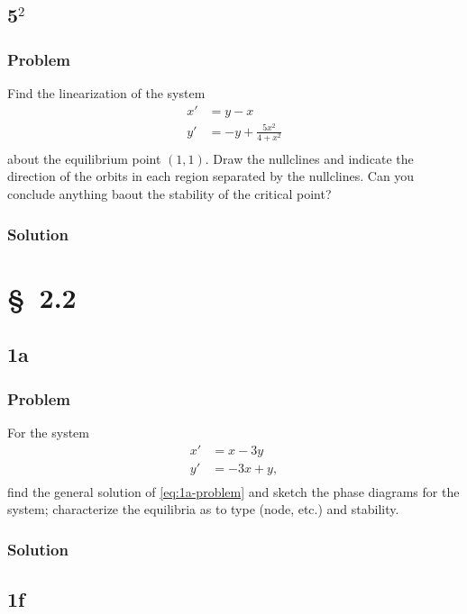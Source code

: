 \documentclass[12pt]{article}
\begin{document}
\subsection{5$^2$}
\subsubsection*{Problem}
Find the linearization of the system
\begin{equation}
  \begin{aligned}
    x'&=y-x \\
    y'&=-y+\frac{5x^2}{4+x^2} \\
  \end{aligned}
\end{equation}
about the equilibrium point $(1,1)$. Draw the nullclines and indicate the
direction of the orbits in each region separated by the nullclines. Can you
conclude anything baout the stability of the critical point?
\subsubsection*{Solution}
\todo[]

\section{\S~2.2}
\subsection{1a}
\subsubsection*{Problem}
For the system
\begin{equation}
  \label{eq:1a-problem}
  \begin{aligned}
    x'&=x-3y\\
    y'&=-3x+y,\\
  \end{aligned}
\end{equation}
find the general solution of \cref{eq:1a-problem} and sketch the phase diagrams
for the system; characterize the equilibria as to type (node, etc.) and
stability.
\subsubsection*{Solution}
\todo[]

\subsection{1f}
\end{document}
